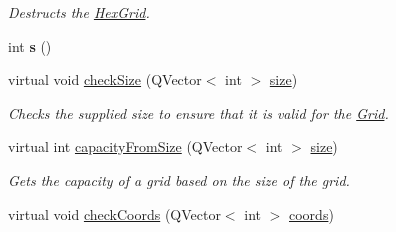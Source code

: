 \begin{DoxyCompactItemize}
\begin{DoxyCompactList}\small\item\em \-Destructs the \hyperlink{classhsom_1_1_hex_grid}{\-Hex\-Grid}. \end{DoxyCompactList}\item 
\hypertarget{classhsom_1_1_fast_hex_grid_a262cbfb75a0861ac88d5d79112e157a7}{int {\bfseries s} ()}\label{classhsom_1_1_fast_hex_grid_a262cbfb75a0861ac88d5d79112e157a7}

\item 
\hypertarget{classhsom_1_1_fast_hex_grid_a2e66b85ee6f69bc1fa7cd51cec4dcd2e}{virtual void \hyperlink{classhsom_1_1_fast_hex_grid_a2e66b85ee6f69bc1fa7cd51cec4dcd2e}{check\-Size} (\-Q\-Vector$<$ int $>$ \hyperlink{classhsom_1_1_grid_a3e846473299eb2c7c259659eb61a6234}{size})}\label{classhsom_1_1_fast_hex_grid_a2e66b85ee6f69bc1fa7cd51cec4dcd2e}

\begin{DoxyCompactList}\small\item\em \-Checks the supplied size to ensure that it is valid for the \hyperlink{classhsom_1_1_grid}{\-Grid}. \end{DoxyCompactList}\item 
\hypertarget{classhsom_1_1_fast_hex_grid_a592489c96e73a494258e46e02e324eec}{virtual int \hyperlink{classhsom_1_1_fast_hex_grid_a592489c96e73a494258e46e02e324eec}{capacity\-From\-Size} (\-Q\-Vector$<$ int $>$ \hyperlink{classhsom_1_1_grid_a3e846473299eb2c7c259659eb61a6234}{size})}\label{classhsom_1_1_fast_hex_grid_a592489c96e73a494258e46e02e324eec}

\begin{DoxyCompactList}\small\item\em \-Gets the capacity of a grid based on the size of the grid. \end{DoxyCompactList}\item 
\hypertarget{classhsom_1_1_fast_hex_grid_a8617bee85643b77b31b54644f019ceb3}{virtual void \hyperlink{classhsom_1_1_fast_hex_grid_a8617bee85643b77b31b54644f019ceb3}{check\-Coords} (\-Q\-Vector$<$ int $>$ \hyperlink{classhsom_1_1_fast_hex_grid_a5305b83a2932122381f5c78a162cd147}{coords})}\label{classhsom_1_1_fast_hex_grid_a8617bee85643b77b31b54644f019ceb3}


\end{DoxyCompactItemize}
